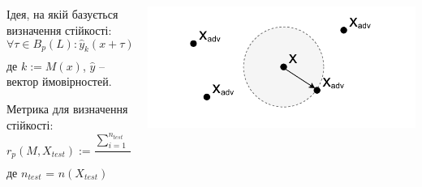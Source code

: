 \documentclass{beamer}
\numberwithin{equation}{section}
\begin{document}
	\subsection{}
	\begin{frame}
		\frametitle{}
		\begin{columns}
			\begin{column}{.50\textwidth}
				Ідея, на якій базується визначення стійкості:
				 \begin{equation}
					\forall \tau \in B_{p}(L): \hat{y}_{k}(x+\tau)>\max _{i: i \neq k} \hat{y}_{i}(x+\tau)
				\end{equation}
				де $k:=M(x)$, $\hat{y}$ -- вектор ймовірностей.
				\vspace{0.2cm}
				
				Метрика для визначення стійкості:
				\begin{equation}
					\label{robustness-metric}
					r_p(M, X_{test}) := \frac{\sum\limits^{n_{test}}_{i = 1}\|x_i-x^{adv}_i\|_{p}}{n_{test}}
				\end{equation}
				де $n_{test}$ = $n(X_{test})$
				
			\end{column}
			
			\begin{column}{.50\textwidth}
				\includegraphics[width=0.45\paperwidth]{../images/2Dball.pdf}
			\end{column}
		\end{columns}
		
	\end{frame}

	
\end{document}
